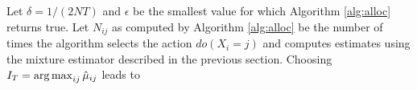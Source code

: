\fi
\begin{theorem}
Let $\delta = 1/(2NT)$ and $\epsilon$ be the smallest value for which Algorithm \ref{alg:alloc} returns true. 
Let $N_{ij}$ as computed by Algorithm \ref{alg:alloc} be the number of times the algorithm selects the action $do(X_i = j)$ 
and computes estimates using the mixture estimator described in the previous section. Choosing $I_T = \argmax_{ij} \hat \mu_{ij}$ leads
to
\end{theorem}














